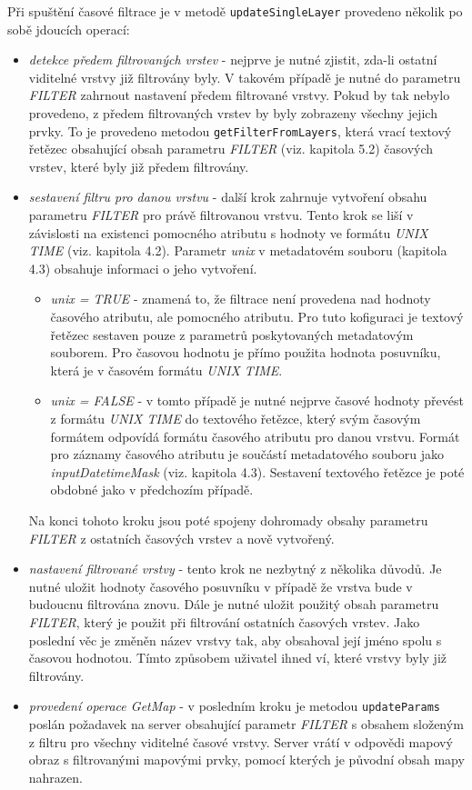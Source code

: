Při spuštění časové filtrace je v metodě \verb|updateSingleLayer| provedeno několik po sobě jdoucích operací:
\begin{itemize}
	\item\textit{detekce předem filtrovaných vrstev} - nejprve je nutné zjistit, zda-li ostatní viditelné vrstvy již filtrovány byly. V takovém případě je nutné do parametru \textit{FILTER} zahrnout nastavení předem filtrované vrstvy. Pokud by tak nebylo provedeno, z předem filtrovaných vrstev by byly zobrazeny všechny jejich prvky. To je provedeno metodou \verb|getFilterFromLayers|, která vrací textový řetězec obsahující obsah parametru \textit{FILTER}  (viz. kapitola 5.2) časových vrstev, které byly již předem filtrovány.
	\item\textit{sestavení filtru pro danou vrstvu} - další krok zahrnuje vytvoření obsahu parametru \textit{FILTER} pro právě filtrovanou vrstvu. Tento krok se liší v závislosti na existenci pomocného atributu s hodnoty ve formátu \textit{UNIX TIME} (viz. kapitola 4.2). Parametr \textit{unix} v metadatovém souboru (kapitola 4.3) obsahuje informaci o jeho vytvoření.
	\begin{itemize}
		\item\textit{unix = TRUE} - znamená to, že filtrace není provedena nad hodnoty časového atributu, ale pomocného atributu. Pro tuto kofiguraci je textový řetězec sestaven pouze z parametrů poskytovaných metadatovým souborem. Pro časovou hodnotu je přímo použita hodnota posuvníku, která je v časovém formátu \textit{UNIX TIME}.
		\item\textit{unix = FALSE} - v tomto případě je nutné nejprve časové hodnoty převést z formátu \textit{UNIX TIME} do textového řetězce, který svým časovým formátem odpovídá formátu časového atributu pro danou vrstvu. Formát pro záznamy časového atributu je součástí metadatového souboru jako \textit{inputDatetimeMask} (viz. kapitola 4.3). Sestavení textového řetězce je poté obdobné jako v předchozím případě.
	\end{itemize}
	Na konci tohoto kroku jsou poté spojeny dohromady obsahy parametru \textit{FILTER} z ostatních časových vrstev a nově vytvořený.
	\item\textit{nastavení filtrované vrstvy} - tento krok ne nezbytný z několika důvodů. Je nutné uložit hodnoty časového posuvníku v případě že vrstva bude v budoucnu filtrována znovu. Dále je nutné uložit použitý obsah parametru \textit{FILTER}, který je použit při filtrování ostatních časových vrstev. Jako poslední věc je změněn název vrstvy tak, aby obsahoval její jméno spolu s časovou hodnotou. Tímto způsobem uživatel ihned ví, které vrstvy byly již filtrovány.
	\item\textit{provedení operace GetMap} - v posledním kroku je metodou \verb|updateParams| poslán požadavek na server obsahující parametr \textit{FILTER} s obsahem složeným z filtru pro všechny viditelné časové vrstvy. Server vrátí v odpovědi mapový obraz s filtrovanými mapovými prvky, pomocí kterých je původní obsah mapy nahrazen.
\end{itemize}


